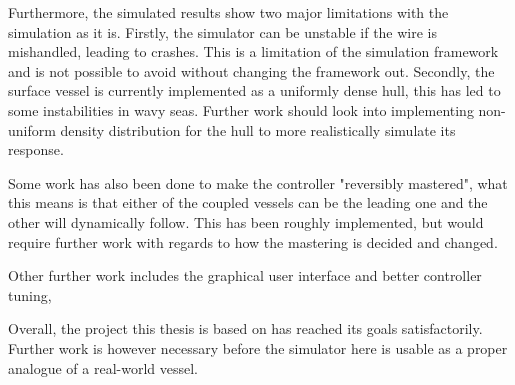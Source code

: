 \documentclass[class=article, crop=false]{standalone}
\begin{document}
Furthermore, the simulated results show two major limitations with the simulation as it is. Firstly, the simulator can be unstable if the wire is mishandled, leading to crashes. This is a limitation of the simulation framework and is not possible to avoid without changing the framework out. Secondly, the surface vessel is currently implemented as a uniformly dense hull, this has led to some instabilities in wavy seas. Further work should look into implementing non-uniform density distribution for the hull to more realistically simulate its response.

Some work has also been done to make the controller "reversibly mastered", what this means is that either of the coupled vessels can be the leading one and the other will dynamically follow. This has been roughly implemented, but would require further work with regards to how the mastering is decided and changed.

Other further work includes the graphical user interface and better controller tuning,

Overall, the project this thesis is based on has reached its goals satisfactorily. Further work is however necessary before the simulator here is usable as a proper analogue of a real-world vessel.
\end{document}
